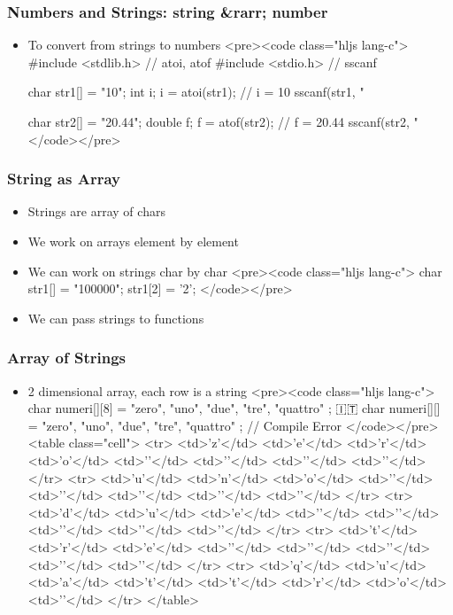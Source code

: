 \documentclass{../c-lecture}
\begin{document}
\begin{frame}
  \frametitle{Numbers and Strings: string &rarr; number}
  \begin{itemize}
    \item To convert from strings to numbers
    <pre><code class="hljs lang-c">
#include <stdlib.h> // atoi, atof
#include <stdio.h> // sscanf

char str1[] = "10";
int i;
i = atoi(str1); // i = 10
sscanf(str1, "%

char str2[] = "20.44";
double f;
f = atof(str2); // f = 20.44
sscanf(str2, "%
    </code></pre>
  \end{itemize}
\end{frame}
\begin{frame}
  \frametitle{String as Array}
  \begin{itemize}
    \item Strings are array of chars
    \item We work on arrays element by element
    \item We can work on strings char by char
    <pre><code class="hljs lang-c">
char str1[] = "100000";
str1[2] = '2';
    </code></pre>
    \item We can pass strings to functions
  \end{itemize}
\end{frame}
\begin{frame}
  \frametitle{Array of Strings}
  \begin{itemize}
    \item 2 dimensional array, each row is a string
    <pre><code class="hljs lang-c">
char numeri[][8] = { "zero", "uno", "due", "tre", "quattro" }; 🇮🇹
char numeri[][] = { "zero", "uno", "due", "tre", "quattro" }; // Compile Error
    </code></pre>
    <table class="cell">
      <tr>
        <td>'z'</td>
        <td>'e'</td>
        <td>'r'</td>
        <td>'o'</td>
        <td>'\0'</td>
        <td>'\0'</td>
        <td>'\0'</td>
        <td>'\0'</td>
      </tr>
      <tr>
        <td>'u'</td>
        <td>'n'</td>
        <td>'o'</td>
        <td>'\0'</td>
        <td>'\0'</td>
        <td>'\0'</td>
        <td>'\0'</td>
        <td>'\0'</td>
      </tr>
      <tr>
        <td>'d'</td>
        <td>'u'</td>
        <td>'e'</td>
        <td>'\0'</td>
        <td>'\0'</td>
        <td>'\0'</td>
        <td>'\0'</td>
        <td>'\0'</td>
      </tr>
      <tr>
        <td>'t'</td>
        <td>'r'</td>
        <td>'e'</td>
        <td>'\0'</td>
        <td>'\0'</td>
        <td>'\0'</td>
        <td>'\0'</td>
        <td>'\0'</td>
      </tr>
      <tr>
        <td>'q'</td>
        <td>'u'</td>
        <td>'a'</td>
        <td>'t'</td>
        <td>'t'</td>
        <td>'r'</td>
        <td>'o'</td>
        <td>'\0'</td>
      </tr>
    </table>
  \end{itemize}
\end{frame}
\end{document}
